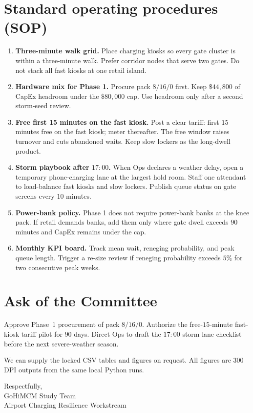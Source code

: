 \documentclass[11pt]{article}
\begin{document}
\section*{Standard operating procedures (SOP)}
\begin{enumerate}
  \item \textbf{Three-minute walk grid.}
  Place charging kiosks so every gate cluster is within a three-minute
  walk.
  Prefer corridor nodes that serve two gates.
  Do not stack all fast kiosks at one retail island.

  \item \textbf{Hardware mix for Phase 1.}
  Procure pack $8/16/0$ first.
  Keep $\$44{,}800$ of CapEx headroom under the $\$80{,}000$ cap.
  Use headroom only after a second storm-seed review.

  \item \textbf{Free first 15 minutes on the fast kiosk.}
  Post a clear tariff: first $15$ minutes free on the fast kiosk;
  meter thereafter.
  The free window raises turnover and cuts abandoned waits.
  Keep slow lockers as the long-dwell product.

  \item \textbf{Storm playbook after $17{:}00$.}
  When Ops declares a weather delay, open a temporary phone-charging
  lane at the largest hold room.
  Staff one attendant to load-balance fast kiosks and slow lockers.
  Publish queue status on gate screens every $10$ minutes.

  \item \textbf{Power-bank policy.}
  Phase 1 does not require power-bank banks at the knee pack.
  If retail demands banks, add them only where gate dwell exceeds
  $90$ minutes and CapEx remains under the cap.

  \item \textbf{Monthly KPI board.}
  Track mean wait, reneging probability, and peak queue length.
  Trigger a re-size review if reneging probability exceeds $5\%$
  for two consecutive peak weeks.
\end{enumerate}

\section*{Ask of the Committee}
Approve Phase~1 procurement of pack $8/16/0$.
Authorize the free-$15$-minute fast-kiosk tariff pilot for $90$ days.
Direct Ops to draft the $17{:}00$ storm lane checklist before the next
severe-weather season.

\medskip
\noindent
We can supply the locked CSV tables and figures on request.
All figures are $300$\,DPI outputs from the same local Python runs.

\bigskip
\noindent
Respectfully,\\[0.6em]
GoHiMCM Study Team\\
Airport Charging Resilience Workstream
\end{document}
